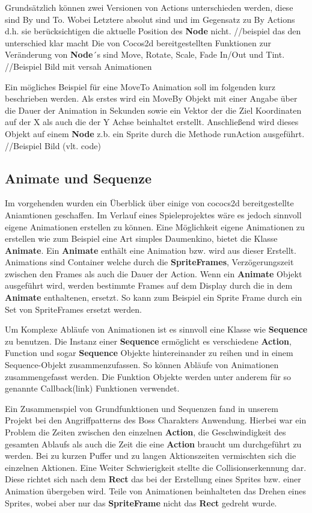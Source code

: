 Grundsätzlich können zwei Versionen von Actions unterschieden werden, diese sind By und To. Wobei Letztere absolut sind und im Gegensatz zu By Actions d.h. sie berücksichtigen  die aktuelle Position des \textbf{Node} nicht. //beispiel das den unterschied klar macht  Die von Cocos2d bereitgestellten Funktionen zur Veränderung von \textbf{Node}´s sind Move, Rotate, Scale, Fade In/Out und Tint. 
//Beispiel Bild mit versah Animationen 

Ein mögliches Beispiel für eine MoveTo Animation soll im folgenden kurz beschrieben werden.
Als erstes wird ein MoveBy Objekt mit einer Angabe über die Dauer der Animation in Sekunden sowie ein Vektor der die Ziel Koordinaten auf der X als auch die der Y Achse beinhaltet erstellt. Anschließend wird dieses Objekt auf einem \textbf{Node} z.b. ein Sprite durch die Methode runAction ausgeführt. 
//Beispiel Bild (vlt. code)


\subsection{Animate und Sequenze}
Im vorgehenden wurden ein Überblick über einige von cococs2d bereitgestellte Aniamtionen geschaffen. Im Verlauf eines Spieleprojektes wäre es jedoch sinnvoll eigene Animationen erstellen zu können. Eine Möglichkeit eigene Animationen zu erstellen wie zum Beispiel eine Art simples Daumenkino, bietet die Klasse \textbf{Animate}. Ein \textbf{Animate} enthält eine Animation bzw. wird aus dieser Erstellt. Animations sind Container welche durch die \textbf{SpriteFrames}, Verzögerungszeit zwischen den Frames als auch die Dauer der Action. Wenn ein \textbf{Animate} Objekt ausgeführt wird, werden bestimmte Frames auf dem Display durch die in dem \textbf{Animate} enthaltenen, ersetzt. So kann zum Beispiel ein Sprite Frame durch ein Set von SpriteFrames ersetzt werden.

Um Komplexe Abläufe von Animationen ist es sinnvoll eine Klasse wie \textbf{Sequence} zu benutzen. Die Instanz einer \textbf{Sequence} ermöglicht es verschiedene \textbf{Action}, Function und sogar \textbf{Sequence} Objekte hintereinander zu reihen und in einem Sequence-Objekt zusammenzufassen. So können Abläufe von Animationen zusammengefasst werden. 
Die Funktion Objekte werden unter anderem für so genannte Callback(link) Funktionen verwendet. 

Ein Zusammenspiel von Grundfunktionen und Sequenzen fand in unserem Projekt bei den Angriffpatterns des Boss Charakters Anwendung. Hierbei war ein Problem die Zeiten zwischen den einzelnen \textbf{Action}, die Geschwindigkeit des gesamten Ablaufs als auch die Zeit die eine \textbf{Action} braucht um durchgeführt zu werden. Bei zu kurzen Puffer und zu langen Aktionszeiten vermischten sich die einzelnen Aktionen. Eine Weiter Schwierigkeit stellte die Collisionserkennung dar. Diese richtet sich nach dem \textbf{Rect} das bei der Erstellung eines Sprites bzw. einer Animation übergeben wird.  Teile von Animationen beinhalteten das Drehen eines Sprites, wobei aber nur das \textbf{SpriteFrame} nicht das \textbf{Rect} gedreht wurde. 

